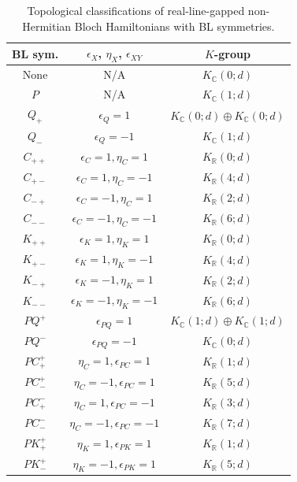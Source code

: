 \documentclass{tADP2e}
\theoremstyle{plain}
\theoremstyle{plain}
\theoremstyle{definition}
\begin{document}
\begin{appendices}
\begin{table}[tbp]
\caption{Topological classifications of real-line-gapped non-Hermitian Bloch Hamiltonians with BL symmetries.}
\begin{center}
\small
\begin{tabular}{ccc}
\hline\hline
BL sym. & $\epsilon_X$, $\eta_X$, $\epsilon_{XY}$ & $K$-group \\ 
\hline
None & N/A  & $K_{\mathbb{C}}(0;d)$  \\ 
$P$ & N/A & $K_{\mathbb{C}}(1;d)$ \\ 
$Q_+$ & $\epsilon_Q=1$ & $K_{\mathbb{C}}(0;d)\oplus K_{\mathbb{C}}(0;d)$ \\ 
$Q_-$ & $\epsilon_Q=-1$ & $K_{\mathbb{C}}(1;d)$ \\ 
$C_{++}$ & $\epsilon_C=1,\eta_C=1$ & $K_{\mathbb{R}}(0;d)$ \\ 
$C_{+-}$ & $\epsilon_C=1,\eta_C=-1$ & $K_{\mathbb{R}}(4;d)$ \\ 
$C_{-+}$ & $\epsilon_C=-1,\eta_C=1$ & $K_{\mathbb{R}}(2;d)$ \\ 
$C_{--}$ & $\epsilon_C=-1,\eta_C=-1$ & $K_{\mathbb{R}}(6;d)$ \\
$K_{++}$ & $\epsilon_K=1,\eta_K=1$ & $K_{\mathbb{R}}(0;d)$ \\
$K_{+-}$ & $\epsilon_K=1,\eta_K=-1$ & $K_{\mathbb{R}}(4;d)$ \\
$K_{-+}$ & $\epsilon_K=-1,\eta_K=1$ & $K_{\mathbb{R}}(2;d)$ \\
$K_{--}$ & $\epsilon_K=-1,\eta_K=-1$ & $K_{\mathbb{R}}(6;d)$ \\
$PQ^+$ & %
$\epsilon_{PQ}=1$ & $K_{\mathbb{C}}(1;d)\oplus K_{\mathbb{C}}(1;d)$ \\
$PQ^-$ & %
$\epsilon_{PQ}=-1$ & $K_{\mathbb{C}}(0;d)$ \\
$PC^+_+$ & %
$\eta_C=1,\epsilon_{PC}=1$ & $K_{\mathbb{R}}(1;d)$ \\
$PC^+_-$ & %
$\eta_C=-1,\epsilon_{PC}=1$ & $K_{\mathbb{R}}(5;d)$ \\
$PC^-_+$ & %
$\eta_C=1,\epsilon_{PC}=-1$ & $K_{\mathbb{R}}(3;d)$ \\
$PC^-_-$ & %
$\eta_C=-1,\epsilon_{PC}=-1$ & $K_{\mathbb{R}}(7;d)$ \\
$PK^+_+$ & %
$\eta_K=1,\epsilon_{PK}=1$ & $K_{\mathbb{R}}(1;d)$ \\
$PK^+_-$ & %
$\eta_K=-1,\epsilon_{PK}=1$ & $K_{\mathbb{R}}(5;d)$ \\

\end{tabular}
\end{center}
\end{table}
\end{appendices}
\end{document}
